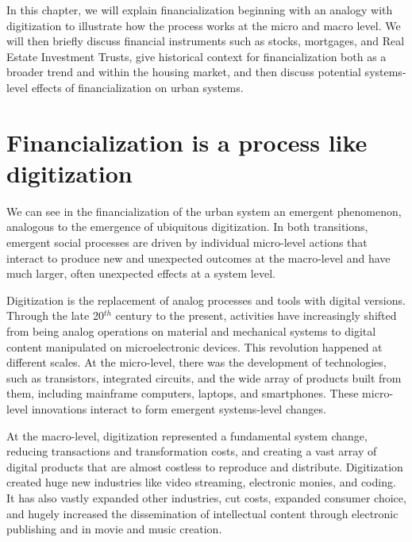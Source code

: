 In this chapter, we will explain financialization beginning with an analogy with digitization to illustrate how the process works at the micro and macro level. We will then briefly discuss financial instruments such as stocks, mortgages, and Real Estate Investment Trusts, give historical context for financialization both as a broader trend and within the housing market, and then discuss potential systems-level effects of financialization on urban systems.


\section{Financialization is a process like digitization}

We can see in the financialization of the urban system an \gls{emergent} phenomenon, analogous to the emergence of ubiquitous \gls{digitization}.
In both transitions, emergent social processes are driven by individual micro-level actions that interact to produce new and unexpected outcomes at the macro-level and 
have much larger, often unexpected effects at a system level. %

Digitization is the replacement of analog processes and tools with digital versions. Through the late 20$^{th}$ century to the present, activities have increasingly shifted from being analog operations on material and mechanical systems to digital content manipulated on microelectronic devices. 
This revolution happened at different scales. At the micro-level, there was the development of technologies, such as transistors, integrated circuits, and the wide array of products built from them, including mainframe computers, laptops, and smartphones.  These micro-level innovations interact to form emergent systems-level changes. 

At the macro-level, digitization represented a fundamental system change, reducing transactions and transformation costs, and creating a vast array of digital products that are almost costless to reproduce and distribute. Digitization created huge new industries like video streaming, electronic monies, and coding. It has also vastly expanded other industries, %
cut costs, expanded consumer choice, %
and hugely increased the dissemination of intellectual content through electronic publishing and in movie and music creation.   

